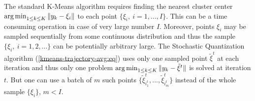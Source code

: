 The standard K-Means algorithm requires finding the nearest cluster center $ \operatorname*{arg\,min}_{1 \leq k \leq K} \| y_k - \xi_i \| $ to each point $ \{ \xi_i, \> i = 1, ..., I \} $. This can be a time consuming operation in case of very large number $ I $. Moreover, points $ \xi_i $ may be sampled sequentially from some continuous distribution and thus the sample $ \{ \xi_i, \> i = 1, 2, ... \} $ can be potentially arbitrary large. The Stochastic Quantization algorithm (\ref{kmeans-trajectory-avg:eq}) uses only one sampled point $ \tilde{\xi}^t $ at each iteration and thus only one problem $ \operatorname*{arg\,min}_{1 \leq k \leq K} \| y_k - \tilde{\xi}^t \| $ is solved at iteration $ t $. But one can use a batch of $ m $ such points $ \{ \tilde{\xi}^t_{i_1^t}, ..., \tilde{\xi}^t_{i_m^t} \} $ instead of the whole sample $ \{ \xi_i \} $, $ m < I $. 
